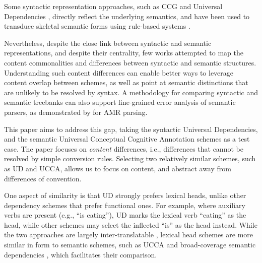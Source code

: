 \documentclass[11pt,a4paper]{article}
\begin{document}
  Some syntactic representation approaches, such as CCG \cite{Steedman:00} and Universal Dependencies \cite[UD; ][]{nivre2016universal},
  directly reflect the underlying semantics, and have been used to
  transduce skeletal semantic forms using rule-based systems \cite{Basile:12,white2016universal,reddy2017universal}.
  
  Nevertheless, despite the close link between syntactic and semantic representations,
  and despite their centrality, few works attempted to map the content commonalities and differences between syntactic and semantic structures.
  Understanding such content differences can enable better ways to leverage content overlap between schemes, as well as point at semantic distinctions that are unlikely to be resolved by syntax.
   A methodology for comparing syntactic and semantic treebanks can also support fine-grained error analysis of semantic parsers, as demonstrated by \citet{szubert2018structured} for AMR \cite{banarescu2013abstract}
   parsing.
   
   This paper aims to address this gap, taking the syntactic Universal Dependencies,
  and the semantic Universal Conceptual Cognitive Annotation \cite[UCCA; ][]{abend2013universal} schemes as a test case. 
  The paper focuses on {\it content} differences, i.e., differences that cannot be resolved by simple
  conversion rules. Selecting two relatively similar schemes, such as UD and UCCA, allows
  us to focus on content, and abstract away from differences of convention.
  
  One aspect of similarity is that UD strongly prefers lexical heads,
   unlike other dependency schemes that prefer functional ones.
   For example, where auxiliary verbs are present (e.g., ``is eating''), UD
   marks the lexical verb ``eating'' as the head, while other schemes
   may select the inflected ``is'' as the head instead.
  While the two approaches are largely inter-translatable
   \cite{Schwartz:12}, lexical head schemes are more similar in form to semantic schemes,
   such as UCCA and broad-coverage semantic dependencies \cite{oepen2016towards},
   which facilitates their comparison.


  
\end{document}
